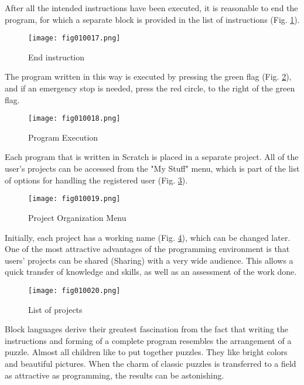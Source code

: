 After all the intended instructions have been executed, it is reasonable to end the program, for which a separate block is provided in the list of instructions (Fig. \ref{fig010017}).

\begin{figure}[H]
   \centering
   \texttt{[image: fig010017.png]}
   \caption{End instruction}
\label{fig010017}
\end{figure}

The program written in this way is executed by pressing the green flag (Fig. \ref{fig010018}), and if an emergency stop is needed, press the red circle, to the right of the green flag.

\begin{figure}[H]
   \centering
   \texttt{[image: fig010018.png]}
   \caption{Program Execution}
\label{fig010018}
\end{figure}

Each program that is written in Scratch is placed in a separate project. All of the user's projects can be accessed from the "My Stuff" menu, which is part of the list of options for handling the registered user (Fig. \ref{fig010019}).

\begin{figure}[H]
   \centering
   \texttt{[image: fig010019.png]}
   \caption{Project Organization Menu}
\label{fig010019}
\end{figure}

Initially, each project has a working name (Fig. \ref{fig010020}), which can be changed later. One of the most attractive advantages of the programming environment is that users' projects can be shared (Sharing) with a very wide audience. This allows a quick transfer of knowledge and skills, as well as an assessment of the work done.

\begin{figure}[H]
   \centering
   \texttt{[image: fig010020.png]}
   \caption{List of projects}
\label{fig010020}
\end{figure}

Block languages derive their greatest fascination from the fact that writing the instructions and forming of a complete program resembles the arrangement of a puzzle. Almost all children like to put together puzzles. They like bright colors and beautiful pictures. When the charm of classic puzzles is transferred to a field as attractive as programming, the results can be astonishing.

